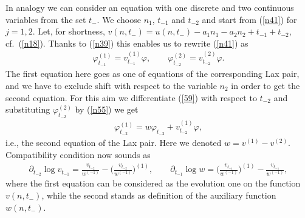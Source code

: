 \documentclass[pdftex]{sigma}
\numberwithin{equation}{section}
\begin{document}
In analogy we can consider an equation with one discrete and two continuous variables from the set $t_{-}$. We
choose $n_1$, $t_{-1}$ and $t_{-2}$ and start from (\ref{n41}) for $j=1,2$. Let, for shortness,
$v(n,t_-)=u(n,t_-)-a_{1}n_1-a_{2}n_2+t_{-1}+t_{-2}$, cf.\ (\ref{n18}). Thanks to (\ref{n39}) this enables us to rewrite
 (\ref{n41}) as
\begin{gather}
 \varphi^{(1)}_{t_{-1}}=v^{(1)}_{t_{-1}}\varphi,\qquad \varphi^{(2)}_{t_{-2}}=v^{(2)}_{t_{-2}}\varphi.\label{n55}
\end{gather}
The f\/irst equation here goes as one of equations of the corresponding Lax pair, and we have to exclude shift with respect
to the variable $n_2$ in order to get the second equation. For this aim we dif\/ferentiate (\ref{59}) with respect to
$t_{-2}$ and substituting $\varphi^{(2)}_{t_{-2}}$ by (\ref{n55}) we get
\begin{gather*}
\varphi^{(1)}_{t_{-2}}=w\varphi_{t_{-2}}+v^{(1)}_{t_{-2}}\varphi,%
\end{gather*}
i.e., the second equation of the Lax pair. Here we denoted $w=v^{(1)}-v^{(2)}$. Compatibility condition now sounds as
\begin{gather*}
\partial_{t_{-2}}\log{v}_{t_{-1}}=
\frac{v_{t_{-2}}}{w^{(-1)}}-\biggl(\frac{v_{t_{-2}}}{w^{(-1)}}\biggr)^{(1)},\qquad %
\partial_{t_{-1}}\log{w}=\biggl(\frac{v_{t_{-1}}}{w^{(-1)}}\biggr)^{(1)}-\frac{v_{t_{-1}}}{w^{(-1)}}, %
\end{gather*}
where the f\/irst equation can be considered as the evolution one on the function~$v(n,t_{-})$, while the second stands as def\/inition of the auxiliary function~$w(n,t_{-})$.
\end{document}
